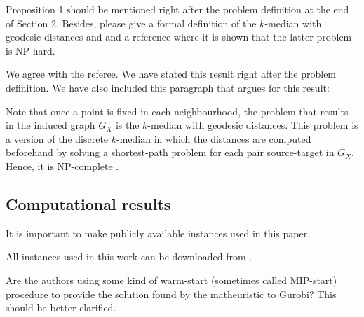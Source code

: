 \documentclass{article}
\newenvironment{reviewer}{\setcounter{pointcounter}{1}}{}
\newcommand{\point}{\text{{\selectfont \thepointcounter} \stepcounter{pointcounter}}}
\begin{document}
\begin{reviewer}
		\begin{itshape}
			Proposition 1 should be mentioned right after the problem definition at the end of Section 2. Besides, please give a formal definition of the $k$-median with geodesic distances and and a reference where it is shown that the latter problem is NP-hard.
		\end{itshape}
		
		\begin{tcolorbox}[breakable,enhanced,coltitle=black,colback=green!5!white,colframe=green!75!black,title=\textbf{Answer R2.\point},borderline={1pt}{0pt}{black},boxrule=0pt]
			We agree with the referee. We have stated this result right after the problem definition. We have also included this paragraph that argues for this result:
			
			\medskip
			
			Note that once a point is fixed in each neighbourhood, the problem that results in the induced graph $G_X$ is the $k$-median with geodesic distances. This problem is a version of the discrete $k$-median in which the distances are computed beforehand by solving a shortest-path problem for each pair source-target in $G_X$. Hence, it is NP-complete \citep{kariv1979}.
		\end{tcolorbox}
		

		
		\subsection*{Computational results}
		
		\begin{itshape}
			It is important to make publicly available instances used in this paper.
		\end{itshape}
		
		\begin{tcolorbox}[breakable,enhanced,coltitle=black,colback=green!5!white,colframe=green!75!black,title=\textbf{Answer R2.\point},borderline={1pt}{0pt}{black},boxrule=0pt]
			All instances used in this work can be downloaded from \cite{valverde2023}.
		\end{tcolorbox}
		
		\begin{itshape}
			Are the authors using some kind of warm-start (sometimes called MIP-start) procedure to provide the solution found by the matheuristic to Gurobi? This should be better clarified.
		\end{itshape}
		

\end{reviewer}
\end{document}
